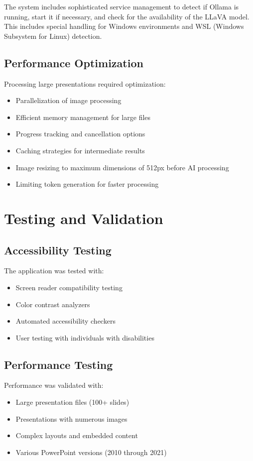 \documentclass{article}
\begin{document}
The system includes sophisticated service management to detect if Ollama is running, start it if necessary, and check for the availability of the LLaVA model. This includes special handling for Windows environments and WSL (Windows Subsystem for Linux) detection.

\subsection{Performance Optimization}
Processing large presentations required optimization:
\begin{itemize}
    \item Parallelization of image processing
    \item Efficient memory management for large files
    \item Progress tracking and cancellation options
    \item Caching strategies for intermediate results
    \item Image resizing to maximum dimensions of 512px before AI processing
    \item Limiting token generation for faster processing
\end{itemize}

\section{Testing and Validation}

\subsection{Accessibility Testing}
The application was tested with:
\begin{itemize}
    \item Screen reader compatibility testing
    \item Color contrast analyzers
    \item Automated accessibility checkers
    \item User testing with individuals with disabilities
\end{itemize}

\subsection{Performance Testing}
Performance was validated with:
\begin{itemize}
    \item Large presentation files (100+ slides)
    \item Presentations with numerous images
    \item Complex layouts and embedded content
    \item Various PowerPoint versions (2010 through 2021)
\end{itemize}
\end{document}
